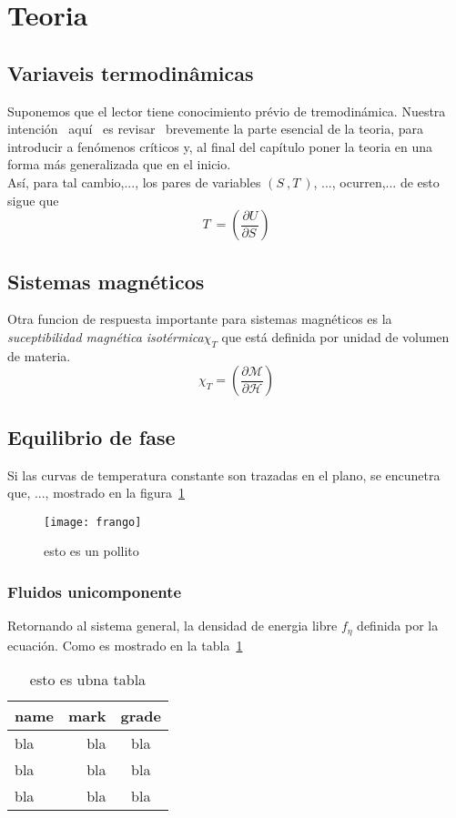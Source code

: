 
\newpage 
 \section{Teoria}
  \subsection{Variaveis termodinâmicas}
   Suponemos que el lector tiene conocimiento prévio de tremodinámica.
   Nuestra intención~\cite{FER82} aquí~\cite{BOR27} es revisar~\cite{MAR09} brevemente la parte esencial de la
   teoria, para introducir a fenómenos críticos y, al final del capítulo
   poner la teoria en una forma más generalizada que en el inicio.\\

   Así, para tal cambio,..., los pares de variables $(S^{~},T^{~})$, ...,
   ocurren,... de esto sigue que
   \begin{equation}
     T^{~}=\left(\frac{\partial U}{\partial S^{~}}\right)
   \end{equation}

   \subsection{Sistemas magnéticos}
    Otra funcion de respuesta importante para sistemas magnéticos es la 
    \textit{suceptibilidad magnética isotérmica}$\chi_{T}$ que está definida
    por unidad de volumen de materia.
    \begin{equation}
      \chi_{T}=\left(\frac{\partial \mathcal{M}}{\partial \mathcal{H}}\right)
    \end{equation}
    \subsection{Equilibrio de fase}
    Si las curvas de temperatura constante son trazadas en el plano, se encunetra que, ..., mostrado en la figura~\ref{fig:pollito}
    \begin{figure}[!h]
      \centering
      \texttt{[image: frango]}
      \caption{esto es un pollito}
      \label{fig:pollito}
    \end{figure}  
    \subsubsection{Fluidos unicomponente}
    Retornando al sistema general, la densidad de energia libre $f_{\eta}$ definida por la ecuación. Como es mostrado en la tabla~\ref{tab:a}
    \begin{table}[!htb]
        \begin{tabular}{lrc}\hline
          name & mark & grade \\
          \hline
          bla & bla & bla \\
          bla & bla & bla \\
          bla & bla & bla \\ \hline
        \end{tabular}
        \caption{esto es ubna tabla}\label{tab:a}
    \end{table}
    \newpage
\newpage
